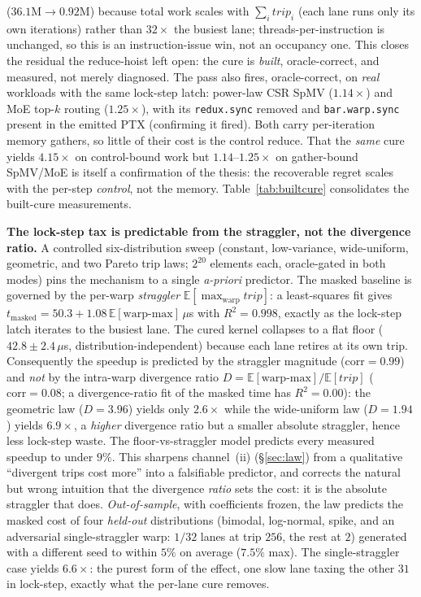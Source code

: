 \documentclass[acmsmall,review,anonymous]{acmart}
\begin{document}
($36.1\mathrm{M}\rightarrow0.92\mathrm{M}$) because total work scales with $\sum_i \mathit{trip}_i$ (each
lane runs only its own iterations) rather than $32\times$ the busiest lane; threads-per-instruction is
unchanged, so this is an instruction-issue win, not an occupancy one. This closes the residual the
reduce-hoist left open: the cure is \emph{built}, oracle-correct, and measured, not merely diagnosed. The pass also fires, oracle-correct, on \emph{real} workloads with the same lock-step
latch: power-law CSR SpMV ($1.14\times$) and MoE top-$k$ routing ($1.25\times$), with its
\texttt{redux.sync} removed and \texttt{bar.warp.sync} present in the emitted PTX (confirming it fired).
Both carry per-iteration memory gathers, so little of their cost is the control reduce. That the \emph{same}
cure yields $4.15\times$ on control-bound work but $1.14$--$1.25\times$ on gather-bound SpMV/MoE is itself a
confirmation of the thesis: the recoverable regret scales with the per-step \emph{control}, not the memory.
Table~\ref{tab:builtcure} consolidates the built-cure measurements.

\textbf{The lock-step tax is predictable from the straggler, not the divergence ratio.} A controlled six-distribution sweep (constant, low-variance, wide-uniform, geometric, and two Pareto trip laws; $2^{20}$ elements each, oracle-gated in both modes) pins the mechanism to a single \emph{a-priori} predictor. The masked baseline is governed by the per-warp \emph{straggler} $\mathbb{E}[\max_{\mathrm{warp}}\mathit{trip}]$: a least-squares fit gives $t_{\mathrm{masked}}=50.3+1.08\,\mathbb{E}[\text{warp-max}]\,\mu$s with $R^2=0.998$, exactly as the lock-step latch iterates to the busiest lane. The cured kernel collapses to a flat floor ($42.8\pm2.4\,\mu$s, distribution-independent) because each lane retires at its own trip. Consequently the speedup is predicted by the straggler magnitude ($\mathrm{corr}=0.99$) and \emph{not} by the intra-warp divergence ratio $D=\mathbb{E}[\text{warp-max}]/\mathbb{E}[\mathit{trip}]$ ($\mathrm{corr}=0.08$; a divergence-ratio fit of the masked time has $R^2=0.00$): the geometric law ($D=3.96$) yields only $2.6\times$ while the wide-uniform law ($D=1.94$) yields $6.9\times$, a \emph{higher} divergence ratio but a smaller absolute straggler, hence less lock-step waste. The floor-vs-straggler model predicts every measured speedup to under $9\%$. This sharpens channel~(ii) (\S\ref{sec:law}) from a qualitative ``divergent trips cost more'' into a falsifiable predictor, and corrects the natural but wrong intuition that the divergence \emph{ratio} sets the cost: it is the absolute straggler that does. \emph{Out-of-sample}, with coefficients frozen, the law predicts the masked cost of four \emph{held-out} distributions (bimodal, log-normal, spike, and an adversarial single-straggler warp: $1/32$ lanes at trip $256$, the rest at $2$) generated with a different seed to within $5\%$ on average ($7.5\%$ max). The single-straggler case yields $6.6\times$: the purest form of the effect, one slow lane taxing the other $31$ in lock-step, exactly what the per-lane cure removes.
\end{document}
